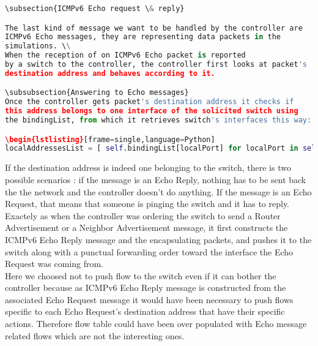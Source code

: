 \documentclass{article}
\begin{document}
\begin{lstlisting}[frame=single,language=Python]
\subsection{ICMPv6 Echo request \& reply}

The last kind of message we want to be handled by the controller are
ICMPv6 Echo messages, they are representing data packets in the
simulations. \\
When the reception of on ICMPv6 Echo packet is reported
by a switch to the controller, the controller first looks at packet's
destination address and behaves according to it.

\subsubsection{Answering to Echo messages}
Once the controller gets packet's destination address it checks if
this address belongs to one interface of the solicited switch using
the bindingList, from which it retrieves switch's interfaces this way:

\begin{lstlisting}[frame=single,language=Python] 
localAddressesList = [ self.bindingList[localPort] for localPort in self.bindingList.keys() if localPort[0]==dpid ]
\end{lstlisting}

If the destination address is indeed one belonging to the switch,
there is two possible scenarios : if the message is an Echo Reply,
nothing has to be sent back the the network and the controller
doesn't do anything. If the message is an Echo Request, that means
that someone is pinging the switch and it has to reply.\\
\newline
Exactely as when the controller was ordering the switch to send a
Router Advertisement or a Neighbor Advertisement message, it first
constructs the ICMPv6 Echo Reply message and the encapsulating
packets, and pushes it to the switch along with a punctual forwarding
order toward the interface the Echo Request was coming from.\\
\newline
Here we choosed not to push flow to the switch even if it can bother
the controller because as ICMPv6 Echo Reply message is constructed from
the associated Echo Request message it would have been necessary to
push flows specific to each Echo Request's destination address that
have their specific actions. Therefore flow table could have been
over populated with Echo message related flows which are not the
interesting ones.
\end{document}
